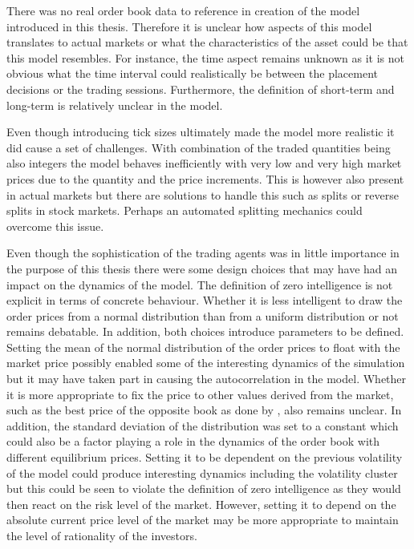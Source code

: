 There was no real order book data to reference in creation of the model
introduced in this thesis. Therefore it is unclear how aspects of this
model translates to actual markets or what the characteristics of the 
asset could be that this model resembles. For instance, the time aspect
remains unknown as it is not obvious what the time interval could
realistically be between the placement decisions or the trading 
sessions. Furthermore, the definition of short-term and long-term is
relatively unclear in the model.

Even though introducing
tick sizes ultimately made the model more realistic it did cause a 
set of challenges. With combination of the traded quantities being
also integers the model behaves inefficiently with very low and very
high market prices due to the quantity and the price increments. This
is however also present in actual markets but there are solutions to handle
this such as splits or reverse splits in stock markets. Perhaps an
automated splitting mechanics could overcome this issue.

Even though the sophistication of the trading agents was in little
importance in the purpose of this thesis there were some design
choices that may have had an impact on the dynamics of the model.
The definition of zero intelligence is not explicit in terms of
concrete behaviour. Whether it is less intelligent to draw the
order prices from a normal distribution than from a uniform
distribution or not remains debatable. In addition, both choices
introduce parameters to be defined. Setting the mean of the
normal distribution of the order prices to float with the 
market price possibly enabled some of the interesting dynamics
of the simulation but it may have taken part in causing the
autocorrelation in the model. Whether it is more appropriate
to fix the price to other values derived from the market,
such as the best price of the opposite book as done by
\citet{Genoa01}, also remains unclear. In addition, the 
standard deviation of the distribution was set to a constant
which could also be a factor playing a role in the dynamics 
of the order book with different equilibrium prices. Setting
it to be dependent on the previous volatility of the model
could produce interesting dynamics including the volatility
cluster but this could be seen to violate the definition
of zero intelligence as they would then react on the risk level
of the market. However, setting it to depend on the absolute
current price level of the market may be more appropriate to 
maintain the level of rationality of the investors.  

